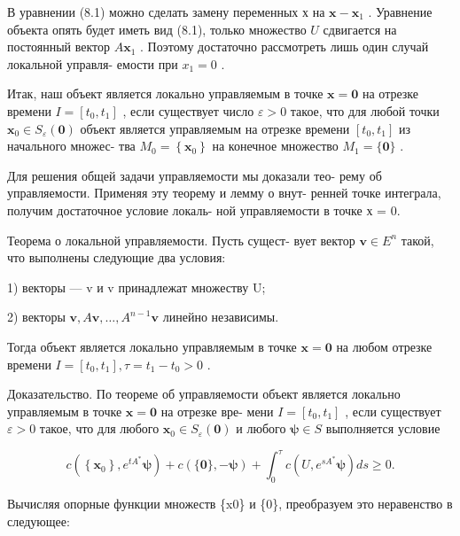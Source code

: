 \documentclass[8pt]{extarticle}
\begin{document}
В уравнении (8.1) можно сделать замену переменных х на \(\mathbf{x} - {\mathbf{x}}_{1}\) . Уравнение объекта опять будет иметь вид (8.1), только множество \(U\) сдвигается на постоянный вектор \(A{\mathbf{x}}_{1}\) . Поэтому достаточно рассмотреть лишь один случай локальной управля- емости при \({x}_{1} = 0\) .

Итак, наш объект является локально управляемым в точке \(\mathbf{x} = \mathbf{0}\) на отрезке времени \(I = \left\lbrack  {{t}_{0},{t}_{1}}\right\rbrack\) , если существует число \(\varepsilon  > 0\) такое, что для любой точки \({\mathbf{x}}_{0} \in  {S}_{\varepsilon }\left( \mathbf{0}\right)\) объект является управляемым на отрезке времени \(\left\lbrack  {{t}_{0},{t}_{1}}\right\rbrack\) из начального множес- тва \({M}_{0} = \left\{  {\mathbf{x}}_{0}\right\}\) на конечное множество \({M}_{1} = \{ \mathbf{0}\}\) .

Для решения общей задачи управляемости мы доказали тео- рему об управляемости. Применяя эту теорему и лемму о внут- ренней точке интеграла, получим достаточное условие локаль- ной управляемости в точке х = 0.

Теорема о локальной управляемости. Пусть сущест- вует вектор \(\mathbf{v} \in  {E}^{n}\) такой, что выполнены следующие два условия:

1) векторы — v и v принадлежат множеству U;

2) векторы \(\mathbf{v},A\mathbf{v},\ldots ,{A}^{n - 1}\mathbf{v}\) линейно независимы.

Тогда объект является локально управляемым в точке \(\mathbf{x} = \mathbf{0}\) на любом отрезке времени \(I = \left\lbrack  {{t}_{0},{t}_{1}}\right\rbrack  ,\tau  = {t}_{1} - {t}_{0} > 0\) .

Доказательство. По теореме об управляемости объект является локально управляемым в точке \(\mathbf{x} = \mathbf{0}\) на отрезке вре- мени \(I = \left\lbrack  {{t}_{0},{t}_{1}}\right\rbrack\) , если существует \(\varepsilon  > 0\) такое, что для любого \({\mathbf{x}}_{0} \in  {S}_{\varepsilon }\left( \mathbf{0}\right)\) и любого \(\mathbf{\psi } \in  S\) выполняется условие

\[
c\left( {\left\{  {\mathbf{x}}_{0}\right\}  ,{e}^{t{A}^{ * }}\mathbf{\psi }}\right)  + c\left( {\{ \mathbf{0}\} , - \mathbf{\psi }}\right)  + {\int }_{0}^{\tau }c\left( {U,{e}^{s{A}^{ * }}\mathbf{\psi }}\right) {ds} \geq  0.
\]

Вычисляя опорные функции множеств \{x0\} и \{0\}, преобразуем это неравенство в следующее:
\end{document}
